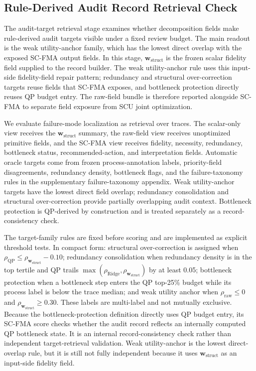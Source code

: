 \documentclass[pdflatex,sn-mathphys-num,iicol]{sn-jnl}
\newcommand{\wstruct}{\ensuremath{\mathbf{w}_{\mathrm{struct}}}}
\begin{document}
\subsection{Rule-Derived Audit Record Retrieval Check}
\label{sec:why-calibration}
\label{sec:audit-results}
\label{sec:oracle-auto-validation}

The audit-target retrieval stage examines whether decomposition fields make rule-derived audit targets visible under a fixed review budget. The main readout is the weak utility-anchor family, which has the lowest direct overlap with the exposed SC-FMA output fields. In this stage, \wstruct{} is the frozen scalar fidelity field supplied to the record builder. The weak utility-anchor rule uses this input-side fidelity-field repair pattern; redundancy and structural over-correction targets reuse fields that SC-FMA exposes, and bottleneck protection directly reuses QP budget entry. The raw-field bundle is therefore reported alongside SC-FMA to separate field exposure from SCU joint optimization.

We evaluate failure-mode localization as retrieval over traces. The scalar-only view receives the \wstruct{} summary, the raw-field view receives unoptimized primitive fields, and the SC-FMA view receives fidelity, necessity, redundancy, bottleneck status, recommended-action, and interpretation fields. Automatic oracle targets come from frozen process-annotation labels, priority-field disagreements, redundancy density, bottleneck flags, and the failure-taxonomy rules in the supplementary failure-taxonomy appendix. Weak utility-anchor targets have the lowest direct field overlap; redundancy consolidation and structural over-correction provide partially overlapping audit context. Bottleneck protection is QP-derived by construction and is treated separately as a record-consistency check.

The target-family rules are fixed before scoring and are implemented as explicit threshold tests. In compact form: structural over-correction is assigned when $\rho_{\mathrm{QP}}\le \rho_{\wstruct{}} - 0.10$; redundancy consolidation when redundancy density is in the top tertile and QP trails $\max(\rho_{\mathrm{Ridge}},\rho_{\wstruct{}})$ by at least 0.05; bottleneck protection when a bottleneck step enters the QP top-25\% budget while its process label is below the trace median; and weak utility anchor when $\rho_{\mathrm{raw}}\le 0$ and $\rho_{\wstruct{}}\ge 0.30$. These labels are multi-label and not mutually exclusive. Because the bottleneck-protection definition directly uses QP budget entry, its SC-FMA score checks whether the audit record reflects an internally computed QP bottleneck state. It is an internal record-consistency check rather than independent target-retrieval validation. Weak utility-anchor is the lowest direct-overlap rule, but it is still not fully independent because it uses \wstruct{} as an input-side fidelity field.
\end{document}

